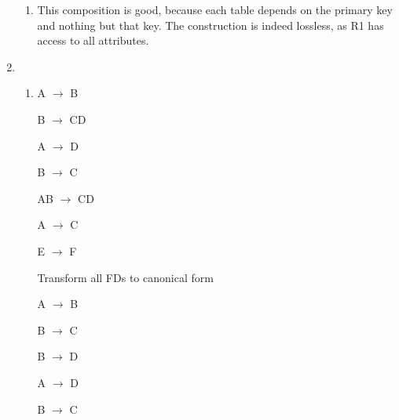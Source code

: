 \documentclass[12pt]{article}
\begin{document}
\begin{enumerate}
\begin{enumerate}
\item %
\vskip 12pt
This composition is good, because each table depends on the primary key and nothing but that key. The construction is indeed lossless, as R1 has access to all attributes.
\begin{table}[h]
\caption{This is the table to check for lossless join created by applying each functional decomp}
\label{tab:oneb}
\end{table}

\end{enumerate}


\item %

\begin{enumerate}

\item %

A $\rightarrow$ B

B $\rightarrow$ CD

A $\rightarrow$ D

B $\rightarrow$ C

AB $\rightarrow$ CD

A $\rightarrow$ C

E $\rightarrow$ F

\hrulefill

Transform all FDs to canonical form

A $\rightarrow$ B

B $\rightarrow$ C

B $\rightarrow$ D

A $\rightarrow$ D

B $\rightarrow$ C


\end{enumerate}
\end{enumerate}
\end{document}
